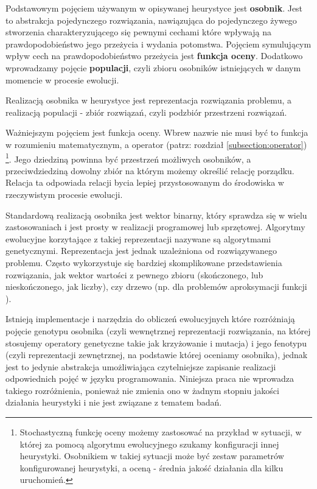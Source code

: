 \documentclass[twoside]{iisthesis}
\begin{document}
Podstawowym pojęciem używanym w opisywanej heurystyce jest \textbf{osobnik}. Jest to abstrakcja pojedynczego rozwiązania, nawiązująca do pojedynczego żywego stworzenia charakteryzującego się pewnymi cechami które wpływają na prawdopodobieństwo jego przeżycia i wydania potomstwa. Pojęciem symulującym wpływ cech na prawdopodobieństwo przeżycia jest \textbf{funkcja oceny}. Dodatkowo wprowadzamy pojęcie \textbf{populacji}, czyli zbioru osobników istniejących w danym momencie w procesie ewolucji.

Realizacją osobnika w heurystyce jest reprezentacja rozwiązania problemu, a realizacją populacji - zbiór rozwiązań, czyli podzbiór przestrzeni rozwiązań.

Ważniejszym pojęciem jest funkcja oceny. Wbrew nazwie nie musi być to funkcja w rozumieniu matematycznym, a operator (patrz: rozdział \ref{subsection:operator}) \footnote{Stochastyczną funkcję oceny możemy zastosować na przykład w sytuacji, w której za pomocą algorytmu ewolucyjnego szukamy konfiguracji innej heurystyki. Osobnikiem w takiej sytuacji może być zestaw parametrów konfigurowanej heurystyki, a oceną - średnia jakość działania dla kilku uruchomień.}. Jego dziedziną powinna być przestrzeń możliwych osobników, a przeciwdziedziną dowolny zbiór na którym możemy określić relację porządku. Relacja ta odpowiada relacji bycia lepiej przystosowanym do środowiska w rzeczywistym procesie ewolucji.

Standardową realizacją osobnika jest wektor binarny, który sprawdza się w wielu zastosowaniach i jest prosty w realizacji programowej lub sprzętowej. Algorytmy ewolucyjne korzytające z takiej reprezentacji nazywane są algorytmami genetycznymi. Reprezentacja jest jednak uzależniona od rozwiązywanego problemu. Często wykorzystuje się bardziej skomplikowane przedstawienia rozwiązania, jak wektor wartości z pewnego zbioru (skończonego, lub nieskończonego, jak liczby), czy drzewo \cite{gen_prog} (np. dla problemów aproksymacji funkcji \cite{gen_prog_foo_approx}).

Istnieją implementacje i narzędzia do obliczeń ewolucyjnych które rozróżniają pojęcie genotypu osobnika (czyli wewnętrznej reprezentacji rozwiązania, na której stosujemy operatory genetyczne takie jak krzyżowanie i mutacja) i jego fenotypu (czyli reprezentacji zewnętrznej, na podstawie której oceniamy osobnika), jednak jest to jedynie abstrakcja umożliwiająca czytelniejsze zapisanie realizacji odpowiednich pojęć w języku programowania. Niniejsza praca nie wprowadza takiego rozróżnienia, ponieważ nie zmienia ono w żadnym stopniu jakości działania heurystyki i nie jest związane z tematem badań.
\end{document}
